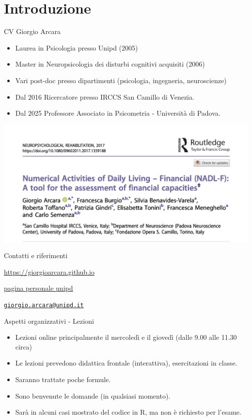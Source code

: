 \documentclass[
  ignorenonframetext,
]{beamer}
\providecommand{\tightlist}{%
  \setlength{\itemsep}{0pt}\setlength{\parskip}{0pt}}
\begin{document}
\section{Introduzione}\label{introduzione}

\begin{frame}{CV Giorgio Arcara}
\label{cv-giorgio-arcara}
\footnotesize

\begin{itemize}
\item
  Laurea in Psicologia presso Unipd (2005)
\item
  Master in Neuropsicologia dei disturbi cognitivi acquisiti (2006)
\item
  Vari post-doc presso dipartimenti (psicologia, ingegneria,
  neuroscienze)
\item
  Dal 2016 Ricercatore presso IRCCS San Camillo di Venezia.
\item
  Dal 2025 Professore Associato in Psicometria - Università di Padova.
\end{itemize}

\pause

\hfill
\includegraphics[width=0.6\linewidth,height=\textheight,keepaspectratio]{Figures/NADL_F.png}
\end{frame}

\begin{frame}{Contatti e riferimenti}
\label{contatti-e-riferimenti}
\centering

\href{https://giorgioarcara.github.io}{\ul{https://giorgioarcara.github.io}}

\href{https://www.dpg.unipd.it/category/ruoli/personale-docente?key=4D0707A2DD6FCCD50B90E4C9F316A625}{\ul{pagina
personale unipd}}

\href{mailto:giorgio.arcara@unipd.it}{\nolinkurl{giorgio.arcara@unipd.it}}
\end{frame}

\begin{frame}{Aspetti organizzativi - Lezioni}
\label{aspetti-organizzativi---lezioni}
\begin{itemize}
\tightlist
\item
  Lezioni online principalmente il mercoledì e il giovedì (dalle 9.00
  alle 11.30 circa)
\item
  Le lezioni prevedono didattica frontale (interattiva), esercitazioni
  in classe.
\item
  Saranno trattate poche formule.
\item
  Sono benvenute le domande (in qualsiasi momento).
\item
  Sarà in alcuni casi mostrato del codice in R, ma non è richiesto per
  l'esame.
\end{itemize}
\end{frame}
\end{document}
